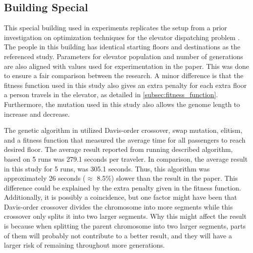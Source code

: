\newpage

\subsection{Building Special}
This special building used in experiments replicates the setup from a prior investigation on optimization techniques for the elevator dispatching problem \cite{ahmed2022investigation}. The people in this building has identical starting floors and destinations as the referenced study. Parameters for elevator population and number of generations are also aligned with values used for experimentation in the paper. This was done to ensure a fair comparison between the research. A minor difference is that the fitness function used in this study also gives an extra penalty for each extra floor a person travels in the elevator, as detailed in \ref{subsec:fitness_function}. Furthermore, the mutation used in this study also allows the genome length to increase and decrease.

The genetic algorithm in \cite{ahmed2022investigation} utilized Davis-order crossover, swap mutation, elitism, and a fitness function that measured the average time for all passengers to reach desired floor. The average result reported from running described algorithm, based on 5 runs was 279.1 seconds per traveler. In comparison, the average result in this study for 5 runs, was 305.1 seconds. Thus, this algorithm was approximately 26 seconds ($\approx$ 8.5\%) slower than the result in the paper. This difference could be explained by the extra penalty given in the fitness function. Additionally, it is possibly a coincidence, but one factor might have been that Davis-order crossover divides the chromosome into more segments while this crossover only splits it into two larger segments. Why this might affect the result is because when splitting the parent chromosome into two larger segments, parts of them will probably not contribute to a better result, and they will have a larger risk of remaining throughout more generations.

